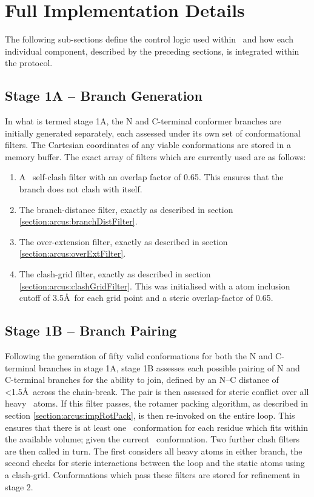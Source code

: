 \section{ Full Implementation Details}
\label{section:arcus:exactImplementation}

The following sub-sections define the control logic used within \arcus\ and how each individual component, described by the preceding sections, is integrated within the protocol.

\subsection{Stage 1A -- Branch Generation}

 In what is termed stage 1A, the N and C-terminal conformer branches are initially generated separately, each assessed under its own set of conformational filters. The Cartesian coordinates of any viable conformations are stored in a memory buffer. The exact array of filters which are currently used are as follows: 

\begin{enumerate} \isep
\item 
A \mainchain\ self-clash filter with an overlap factor of 0.65. This ensures that the branch does not clash with itself.\item
The branch-distance filter, exactly as described in section \ref{section:arcus:branchDistFilter}.\item
The over-extension filter, exactly as described in section \ref{section:arcus:overExtFilter}.\item
The clash-grid filter, exactly as described in section \ref{section:arcus:clashGridFilter}. This was initialised with a atom inclusion cutoff of 3.5\AA\ for each grid point and a steric overlap-factor of 0.65.
\end{enumerate}


\subsection{Stage 1B -- Branch Pairing}

Following the generation of fifty valid conformations for both the N and C-terminal branches in stage 1A, stage 1B assesses each possible pairing of N and C-terminal branches for the ability to join, defined by an N--C distance of \textless1.5\AA\ across the chain-break.
The pair is then assessed for steric conflict over all heavy \mainchain\ atoms. If this filter passes, the rotamer packing algorithm, as described in section \ref{section:arcus:impRotPack}, is then re-invoked on the entire loop. This ensures that there is at least one \sidechain\ conformation for each residue which fits within the available volume; given the current \mainchain\ conformation.
Two further clash filters are then called in turn. The first considers all heavy atoms in either branch, the second checks for steric interactions between the loop and the static atoms using a clash-grid. Conformations which pass these filters are stored for refinement in stage 2. 

